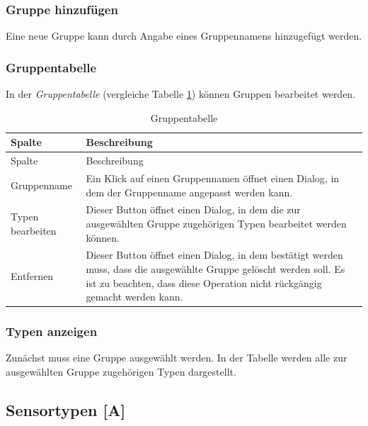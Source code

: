 \documentclass[
]{article}
\begin{document}
\hypertarget{gruppe-hinzufuxfcgen}{%
\subsubsection{Gruppe hinzufügen}\label{gruppe-hinzufuxfcgen}}

Eine neue Gruppe kann durch Angabe eines Gruppennamens hinzugefügt werden.

\hypertarget{gruppentabelle}{%
\subsubsection{Gruppentabelle}\label{gruppentabelle}}

In der \emph{Gruppentabelle} (vergleiche Tabelle \ref{tab:group-table}) können Gruppen bearbeitet werden.

\begin{longtable}[]{@{}
  >{\raggedright\arraybackslash}p{}
  >{\raggedright\arraybackslash}p{}@{}}
\caption{\label{tab:group-table} Gruppentabelle}\tabularnewline
\toprule
Spalte & Beschreibung \\
\midrule
\endfirsthead
\toprule
Spalte & Beschreibung \\
\midrule
\endhead
Gruppenname & Ein Klick auf einen Gruppennamen öffnet einen Dialog, in dem der Gruppenname angepasst werden kann. \\
Typen bearbeiten & Dieser Button öffnet einen Dialog, in dem die zur ausgewählten Gruppe zugehörigen Typen bearbeitet werden können. \\
Entfernen & Dieser Button öffnet einen Dialog, in dem bestätigt werden muss, dass die ausgewählte Gruppe gelöscht werden soll. Es ist zu beachten, dass diese Operation nicht rückgängig gemacht werden kann. \\
\bottomrule
\end{longtable}

\hypertarget{typen-anzeigen}{%
\subsubsection{Typen anzeigen}\label{typen-anzeigen}}

Zunächst muss eine Gruppe ausgewählt werden. In der Tabelle werden alle zur ausgewählten Gruppe zugehörigen Typen dargestellt.

\hypertarget{type}{%
\subsection{Sensortypen {[}A{]}}\label{type}}
\end{document}
